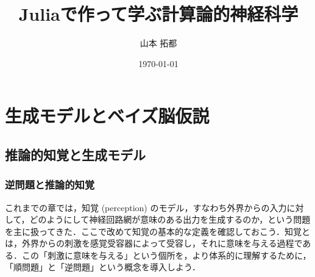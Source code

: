 \documentclass[titlepage]{ltjsbook}
\title{\Huge \textbf{Juliaで作って学ぶ計算論的神経科学}}
\author{\huge 山本 拓都}
\date{\huge \today}
\begin{document}
\setcounter{tocdepth}{2}
\tableofcontents
\clearpage
\chapter{生成モデルとベイズ脳仮説}
\section{推論的知覚と生成モデル}
\subsection{逆問題と推論的知覚}
これまでの章では，知覚 (perception) のモデル，すなわち外界からの入力に対して，どのようにして神経回路網が意味のある出力を生成するのか，という問題を主に扱ってきた．ここで改めて知覚の基本的な定義を確認しておこう．知覚とは，外界からの刺激を感覚受容器によって受容し，それに意味を与える過程である．この「刺激に意味を与える」という個所を，より体系的に理解するために，「順問題」と「逆問題」という概念を導入しよう．
\end{document}
